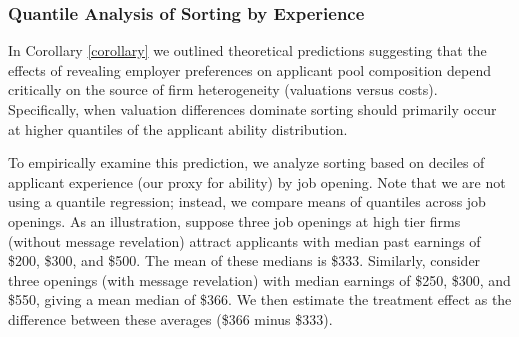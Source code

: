 \documentclass[12pt]{article}
\begin{document}
\subsubsection{Quantile Analysis of Sorting by Experience}
\label{online_app:empirical_analysis}

In Corollary \ref{corollary} we outlined theoretical predictions suggesting that the effects of revealing employer preferences on applicant pool composition depend critically on the source of firm heterogeneity (valuations versus costs). Specifically, when valuation differences dominate sorting should primarily occur at higher quantiles of the applicant ability distribution.

To empirically examine this prediction, we analyze sorting based on deciles of applicant experience (our proxy for ability) by job opening. Note that we are not using a quantile regression; instead, we compare means of quantiles across job openings. As an illustration, suppose three job openings at high tier firms (without message revelation) attract applicants with median past earnings of \$200, \$300, and \$500. The mean of these medians is \$333. Similarly, consider three openings (with message revelation) with median earnings of \$250, \$300, and \$550, giving a mean median of \$366. We then estimate the treatment effect as the difference between these averages (\$366 minus \$333).
\end{document}
